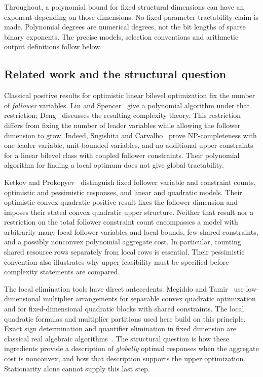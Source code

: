 Throughout, a polynomial bound for fixed structural dimensions can have an
exponent depending on those dimensions. No fixed-parameter tractability claim
is made. Polynomial degrees are numerical degrees, not the bit lengths of
sparse binary exponents. The precise models, selection conventions and
arithmetic output definitions follow below.

\subsection{Related work and the structural question}\label{subsec:related}

Classical positive results for optimistic linear bilevel optimization fix
the number of \emph{follower} variables. Liu and Spencer~\cite{LiuSpencer1995} give a
polynomial algorithm under that restriction; Deng~\cite{Deng1998}
discusses the resulting complexity theory. This restriction differs from
fixing the number of leader variables while allowing the follower dimension
to grow. Indeed, Sugishita and Carvalho~\cite{SugishitaCarvalhoIPCO2026,SugishitaCarvalho2026} prove
NP-completeness with one leader variable, unit-bounded variables, and no
additional upper constraints for a linear bilevel class with coupled
follower constraints. Their polynomial algorithm for finding a local
optimum does not give global tractability.

Ketkov and Prokopyev~\cite{KetkovProkopyev2026} distinguish fixed follower
variable and constraint counts, optimistic and pessimistic responses, and
linear and quadratic models. Their optimistic convex-quadratic positive
result fixes the follower dimension and imposes their stated convex
quadratic upper structure. Neither that result nor a restriction on the
total follower constraint count encompasses a model with arbitrarily many
local follower variables and local bounds, few shared constraints, and a
possibly nonconvex polynomial aggregate cost. In particular, counting
shared resource rows separately from local rows is essential. Their
pessimistic convention also illustrates why upper feasibility must be
specified before complexity statements are compared.

The local elimination tools have direct antecedents. Megiddo and
Tamir~\cite{MegiddoTamir1993} use low-dimensional multiplier arrangements
for separable convex quadratic optimization and for fixed-dimensional
quadratic blocks with shared constraints. The local quadratic formulas
and multiplier partitions used here build on this principle. Exact sign
determination and quantifier elimination in fixed dimension are classical
real algebraic algorithms~\cite{BasuPollackRoy1996}. The structural question
is how these ingredients provide a description of \emph{globally} optimal
responses when the aggregate cost is nonconvex, and how that description
supports the upper optimization. Stationarity alone cannot supply this
last step.

